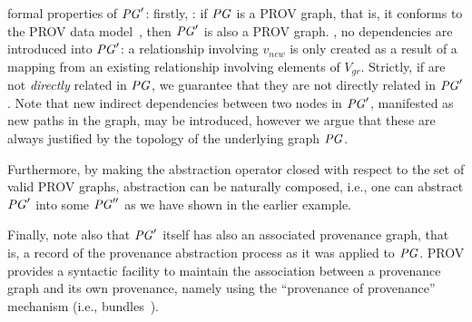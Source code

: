  formal properties of $\mathit{PG}'$: firstly, : if $\mathit{PG}$ is a  PROV graph, that is, it conforms to the PROV data model~\citep{w3c-prov-dm}, then $\mathit{PG}'$ is also a  PROV graph.
, no   dependencies are introduced into $\mathit{PG}'$: a  relationship involving $v_{new}$ is only created as a result of a mapping from an existing relationship involving elements of $V_{gr}$. Strictly, if  are not \textit{directly} related in $\mathit{PG}$, we guarantee that they are not directly related in $\mathit{PG}'$.  Note that new indirect dependencies between two nodes in $\mathit{PG}'$, manifested as new paths in the graph, may be introduced, however we argue that these are always justified by the topology of the underlying graph $\mathit{PG}$.

 



Furthermore, by making the abstraction operator closed with respect to the set of valid PROV graphs, abstraction can be naturally composed, i.e.,  one can abstract $\mathit{PG}'$ into some $\mathit{PG}''$ as we have shown in the earlier example.

%
Finally, note also that $\mathit{PG}'$ itself has also an associated provenance graph, that is, a record of the provenance abstraction process as it was applied to $\mathit{PG}$. 
PROV provides a syntactic facility to maintain the association between a provenance graph and its own provenance, namely using the ``provenance of provenance'' mechanism (i.e., bundles~\citep{w3c-prov-dm}).





